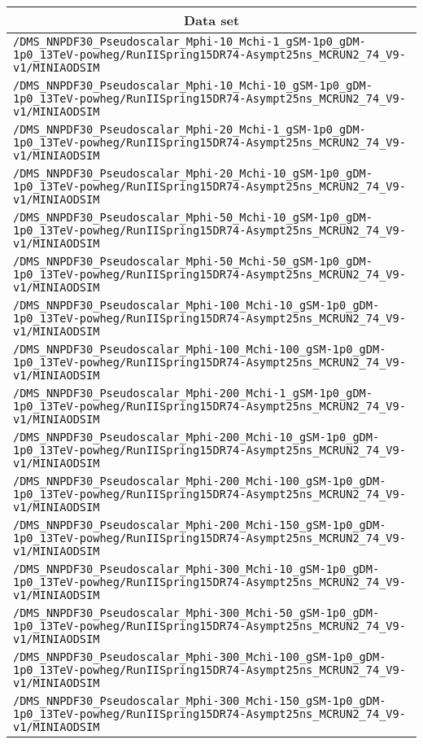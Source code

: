 \begin{center}
\begin{tabular}{l}
\hline\hline
\multicolumn{1}{c}{Data set}\tabularnewline
\hline
\verb!/DMS_NNPDF30_Pseudoscalar_Mphi-10_Mchi-1_gSM-1p0_gDM-1p0_13TeV-powheg/RunIISpring15DR74-Asympt25ns_MCRUN2_74_V9-v1/MINIAODSIM! \tabularnewline
\verb!/DMS_NNPDF30_Pseudoscalar_Mphi-10_Mchi-10_gSM-1p0_gDM-1p0_13TeV-powheg/RunIISpring15DR74-Asympt25ns_MCRUN2_74_V9-v1/MINIAODSIM! \tabularnewline
\verb!/DMS_NNPDF30_Pseudoscalar_Mphi-20_Mchi-1_gSM-1p0_gDM-1p0_13TeV-powheg/RunIISpring15DR74-Asympt25ns_MCRUN2_74_V9-v1/MINIAODSIM! \tabularnewline
\verb!/DMS_NNPDF30_Pseudoscalar_Mphi-20_Mchi-10_gSM-1p0_gDM-1p0_13TeV-powheg/RunIISpring15DR74-Asympt25ns_MCRUN2_74_V9-v1/MINIAODSIM! \tabularnewline
\verb!/DMS_NNPDF30_Pseudoscalar_Mphi-50_Mchi-10_gSM-1p0_gDM-1p0_13TeV-powheg/RunIISpring15DR74-Asympt25ns_MCRUN2_74_V9-v1/MINIAODSIM! \tabularnewline
\verb!/DMS_NNPDF30_Pseudoscalar_Mphi-50_Mchi-50_gSM-1p0_gDM-1p0_13TeV-powheg/RunIISpring15DR74-Asympt25ns_MCRUN2_74_V9-v1/MINIAODSIM! \tabularnewline
\verb!/DMS_NNPDF30_Pseudoscalar_Mphi-100_Mchi-10_gSM-1p0_gDM-1p0_13TeV-powheg/RunIISpring15DR74-Asympt25ns_MCRUN2_74_V9-v1/MINIAODSIM! \tabularnewline
\verb!/DMS_NNPDF30_Pseudoscalar_Mphi-100_Mchi-100_gSM-1p0_gDM-1p0_13TeV-powheg/RunIISpring15DR74-Asympt25ns_MCRUN2_74_V9-v1/MINIAODSIM! \tabularnewline
\verb!/DMS_NNPDF30_Pseudoscalar_Mphi-200_Mchi-1_gSM-1p0_gDM-1p0_13TeV-powheg/RunIISpring15DR74-Asympt25ns_MCRUN2_74_V9-v1/MINIAODSIM! \tabularnewline
\verb!/DMS_NNPDF30_Pseudoscalar_Mphi-200_Mchi-10_gSM-1p0_gDM-1p0_13TeV-powheg/RunIISpring15DR74-Asympt25ns_MCRUN2_74_V9-v1/MINIAODSIM! \tabularnewline
\verb!/DMS_NNPDF30_Pseudoscalar_Mphi-200_Mchi-100_gSM-1p0_gDM-1p0_13TeV-powheg/RunIISpring15DR74-Asympt25ns_MCRUN2_74_V9-v1/MINIAODSIM! \tabularnewline
\verb!/DMS_NNPDF30_Pseudoscalar_Mphi-200_Mchi-150_gSM-1p0_gDM-1p0_13TeV-powheg/RunIISpring15DR74-Asympt25ns_MCRUN2_74_V9-v1/MINIAODSIM! \tabularnewline
\verb!/DMS_NNPDF30_Pseudoscalar_Mphi-300_Mchi-10_gSM-1p0_gDM-1p0_13TeV-powheg/RunIISpring15DR74-Asympt25ns_MCRUN2_74_V9-v1/MINIAODSIM! \tabularnewline
\verb!/DMS_NNPDF30_Pseudoscalar_Mphi-300_Mchi-50_gSM-1p0_gDM-1p0_13TeV-powheg/RunIISpring15DR74-Asympt25ns_MCRUN2_74_V9-v1/MINIAODSIM! \tabularnewline
\verb!/DMS_NNPDF30_Pseudoscalar_Mphi-300_Mchi-100_gSM-1p0_gDM-1p0_13TeV-powheg/RunIISpring15DR74-Asympt25ns_MCRUN2_74_V9-v1/MINIAODSIM! \tabularnewline
\verb!/DMS_NNPDF30_Pseudoscalar_Mphi-300_Mchi-150_gSM-1p0_gDM-1p0_13TeV-powheg/RunIISpring15DR74-Asympt25ns_MCRUN2_74_V9-v1/MINIAODSIM! \tabularnewline

\end{tabular}
\end{center}
